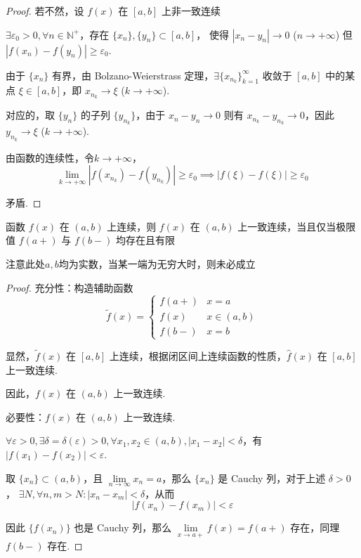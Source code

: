 \begin{proof}
	若不然，设 \( f(x) \) 在 \([a, b]\) 上非一致连续
	
	\(\exists \varepsilon_0 > 0, \forall n \in \mathbb{N}^+\)，存在 \(\{x_n\},\{y_n\} \subset [a, b]\)，
	使得 \(|x_n - y_n| \to 0\) (\(n \to +\infty\)) 但 \(|f(x_n) - f(y_n)| \geqslant \varepsilon_0\).
	
	由于 \(\{x_n\}\) 有界，由 Bolzano-Weierstrass 定理，\(\exists \{x_{n_k}\}_{k=1}^{\infty}\) 收敛于 \([a, b]\) 中的某点 \(\xi \in [a, b]\)，即 \(x_{n_k} \to \xi\) (\(k \to +\infty\)).
	
	对应的，取 \(\{y_n\}\) 的子列 \(\{y_{n_k}\}\)，由于 \(x_n - y_n \to 0\) 则有 \(x_{n_k} - y_{n_k} \to 0\)，因此 \(y_{n_k} \to \xi\) (\(k \to +\infty\)).
	
	由函数的连续性，令\(k \to +\infty\)，
	\[
	\lim_{k \to +\infty} |f(x_{n_k}) - f(y_{n_k})| \geqslant \varepsilon_0 \implies |f(\xi) - f(\xi)| \geqslant \varepsilon_0
	\]
	
	矛盾.
\end{proof}
\begin{corollary}
	函数 \( f(x) \) 在 \((a, b)\) 上连续，则 \( f(x) \) 在 \((a, b)\) 上一致连续，当且仅当极限值 \( f(a+) \) 与 \( f(b-) \) 均存在且有限
	
\end{corollary}
注意此处$a,b$均为实数，当某一端为无穷大时，则未必成立
\begin{proof}
	充分性：构造辅助函数
	\[
	\widetilde{f}(x) = \begin{cases}
		f(a+) & x = a \\
		f(x) & x \in (a, b) \\
		f(b-) & x = b
	\end{cases}
	\]
	
	显然，\(\widetilde{f}(x)\) 在 \([a, b]\) 上连续，根据闭区间上连续函数的性质，\(\hat{f}(x)\) 在 \([a, b]\) 上一致连续.
	
	因此，\(f(x)\) 在 \((a, b)\) 上一致连续.
	
	必要性：\( f(x) \) 在 \((a, b)\) 上一致连续.
	
	\(\forall \varepsilon > 0, \exists \delta = \delta(\varepsilon) > 0, \forall x_1, x_2 \in (a, b), |x_1 - x_2| < \delta\)，有 \(|f(x_1) - f(x_2)| < \varepsilon\).
	
	取 \(\{x_n\} \subset (a, b)\)，且 \(\lim\limits_{n \to \infty} x_n = a\)，那么 \(\{x_n\}\) 是 Cauchy 列，对于上述 \(\delta > 0\)，
	\(\exists N, \forall n, m > N: |x_n - x_m| < \delta\)，从而
	\[
	|f(x_n) - f(x_m)| < \varepsilon
	\]
	
	因此 \(\{f(x_n)\}\) 也是 Cauchy 列，那么 \(\lim\limits_{x \to a+} f(x) = f(a+)\) 存在，同理 \(f(b-)\) 存在.
	
\end{proof}
